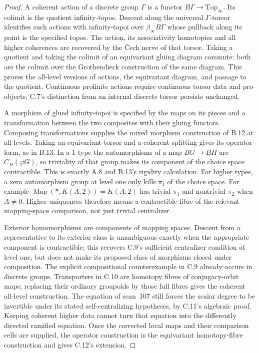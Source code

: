 \begin{proof}
A coherent action of a discrete group $\Gamma$ is a functor $B\Gamma\to\mathrm{Top}_\infty$. Its colimit is the quotient infinity-topos. Descent along the universal $\Gamma$-torsor identifies such actions with infinity-topoi over $\beta_\infty B\Gamma$ whose pullback along its point is the specified topos. The action, its associativity homotopies and all higher coherences are recovered by the \v Cech nerve of that torsor. Taking a quotient and taking the colimit of an equivariant gluing diagram commute: both are the colimit over the Grothendieck construction of the same diagram. This proves the all-level versions of actions, the equivariant diagram, and passage to the quotient. Continuous profinite actions require continuous torsor data and pro-objects; C.7's distinction from an internal discrete torsor persists unchanged.

A morphism of glued infinity-topoi is specified by the maps on its pieces and a transformation between the two composites with their gluing functors. Composing transformations supplies the mixed morphism construction of B.12 at all levels. Taking an equivariant torsor and a coherent splitting gives its operator form, as in B.13. In a $1$-type the automorphisms of a map $BG\to BH$ are $C_H(\varphi G)$, so triviality of that group makes its component of the choice space contractible. This is exactly A.8 and B.13's rigidity calculation. For higher types, a zero automorphism group at level one only kills $\pi_1$ of the choice space. For example
$\operatorname{Map}(*,K(A,2))=K(A,2)$ has trivial $\pi_1$ and nontrivial $\pi_2$ when $A\ne0$. Higher uniqueness therefore means a contractible fibre of the relevant mapping-space comparison, not just trivial centralizer.

Exterior homomorphisms are components of mapping spaces. Descent from a representative to its exterior class is unambiguous exactly when the appropriate component is contractible; this recovers C.9's sufficient centralizer condition at level one, but does not make its proposed class of morphisms closed under composition. The explicit compositional counterexample in C.9 already occurs in discrete groups. Transporters in C.10 are homotopy fibres of conjugacy-orbit maps; replacing their ordinary groupoids by those full fibres gives the coherent all-level construction. The equation of scan~107 still forces the scalar degree to be invertible under its stated self-centralizing hypotheses, by C.11's algebraic proof. Keeping coherent higher data cannot turn that equation into the differently directed ramified equation. Once the corrected local maps and their comparison cells are supplied, the operator construction is the equivariant homotopy-fibre construction and gives C.12's extension. 
\end{proof}

